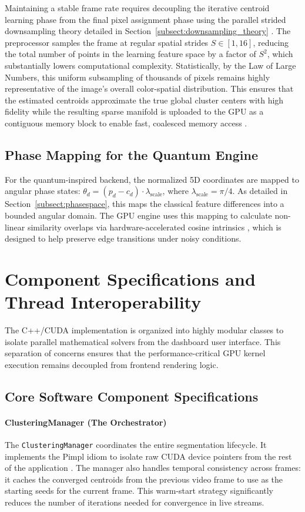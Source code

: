 Maintaining a stable frame rate requires decoupling the iterative centroid learning phase from the final pixel assignment phase using the parallel strided downsampling theory detailed in Section~\ref{subsect:downsampling_theory} \cite{achanta2012slic}. The preprocessor samples the frame at regular spatial strides $S \in [1, 16]$, reducing the total number of points in the learning feature space by a factor of $S^2$, which substantially lowers computational complexity. Statistically, by the Law of Large Numbers, this uniform subsampling of thousands of pixels remains highly representative of the image's overall color-spatial distribution. This ensures that the estimated centroids approximate the true global cluster centers with high fidelity \cite{mouton2020stride} while the resulting sparse manifold is uploaded to the GPU as a contiguous memory block to enable fast, coalesced memory access \cite{CudaGuide}.

\subsection{Phase Mapping for the Quantum Engine}
For the quantum-inspired backend, the normalized 5D coordinates are mapped to angular phase states: $\theta_d = (p_d - c_d) \cdot \lambda_{\text{scale}}$, where $\lambda_{\text{scale}} = \pi/4$. As detailed in Section~\ref{subsect:phasespace}, this maps the classical feature differences into a bounded angular domain. The GPU engine uses this mapping to calculate non-linear similarity overlaps via hardware-accelerated cosine intrinsics \cite{CudaGuide}, which is designed to help preserve edge transitions under noisy conditions.

\section{Component Specifications and Thread Interoperability}
The C++/CUDA implementation is organized into highly modular classes to isolate parallel mathematical solvers from the dashboard user interface. This separation of concerns ensures that the performance-critical GPU kernel execution remains decoupled from frontend rendering logic.

\subsection{Core Software Component Specifications}

\paragraph{ClusteringManager (The Orchestrator)}
The \texttt{ClusteringManager} coordinates the entire segmentation lifecycle. It implements the Pimpl idiom to isolate raw CUDA device pointers from the rest of the application \cite{stroustrup2022tour, meyers2014effective}. The manager also handles temporal consistency across frames: it caches the converged centroids from the previous video frame to use as the starting seeds for the current frame. This warm-start strategy significantly reduces the number of iterations needed for convergence in live streams.

